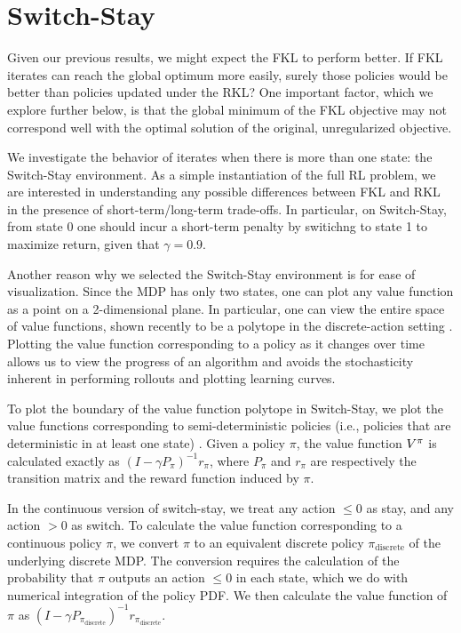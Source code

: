 \documentclass[\main/thesis.tex]{subfiles}
\begin{document}
\section{Switch-Stay}
Given our previous results, we might expect the FKL to perform better. If FKL iterates can reach the global optimum more easily, surely those policies would be better than policies updated under the RKL? One important factor, which we explore further below, is that the global minimum of the FKL objective may not correspond well with the optimal solution of the original, unregularized objective. 

We investigate the behavior of iterates when there is more than one state: the Switch-Stay environment. As a simple instantiation of the full RL problem, we are interested in understanding any possible differences between FKL and RKL in the presence of short-term/long-term trade-offs. In particular, on Switch-Stay, from state 0 one should incur a short-term penalty by switichng to state 1 to maximize return, given that $\gamma = 0.9$.

Another reason why we selected the Switch-Stay environment is for ease of visualization. Since the MDP has only two states, one can plot any value function as a point on a 2-dimensional plane. In particular, one can view the entire space of value functions, shown recently to be a polytope in the discrete-action setting \citep{dadashi2019value}. Plotting the value function corresponding to a policy as it changes over time allows us to view the progress of an algorithm and avoids the stochasticity inherent in performing rollouts and plotting learning curves.

To plot the boundary of the value function polytope in Switch-Stay, we plot the value functions corresponding to semi-deterministic policies (i.e., policies that are deterministic in at least one state) \citep{dadashi2019value}. Given a policy $\pi$, the value function $V^\pi$ is calculated exactly as $(I - \gamma P_\pi)^{-1}r_\pi$, where $P_\pi$ and $r_\pi$ are respectively the transition matrix and the reward function induced by $\pi$. 

In the continuous version of switch-stay, we treat any action $ \leq 0$ as stay, and any action $ > 0$ as switch. To calculate the value function corresponding to a continuous policy $\pi$, we convert $\pi$ to an equivalent discrete policy $\pi_{\mathrm{discrete}}$ of the underlying discrete MDP. The conversion requires the calculation of the probability that $\pi$ outputs an action $\leq 0$ in each state, which we do with numerical integration of the policy PDF. We then calculate the value function of $\pi$ as $(I - \gamma P_{\pi_{\mathrm{discrete}}})^{-1}r_{\pi_{\mathrm{discrete}}}$.
\end{document}
